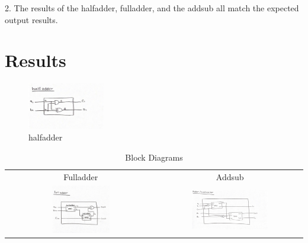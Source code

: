 \documentclass[11pt]{article}
\begin{document}
2. The results of the halfadder, fulladder, and the addsub all match the expected output results. 


\section*{Results}


 \begin{figure}[ht]\centering
 	\caption*{halfadder}
	\includegraphics [width=0.3\textwidth,trim=0 0 0 0, clip]{halfadder_blockdiagram}
\end{figure}

\begin{table}[h]\centering
	\begin{tabular}{cc}
		Fulladder & Addsub \\
		\includegraphics [width=0.4\textwidth,trim=0 0 0 0, clip]{fulladder_blockdiagram} &
		\includegraphics [width=0.55\textwidth,trim=0 0 0 0, clip]{addsub_blockdiagram} \\
	\end{tabular}
	\caption{Block Diagrams}
	\label{fig:sim_with_table}
\end{table}
\end{document}
